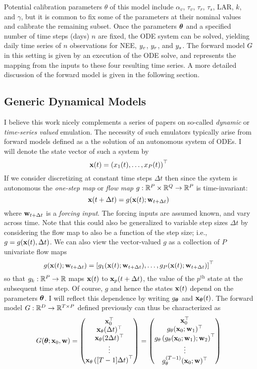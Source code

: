 \documentclass[12pt]{article}
\begin{document}
Potential calibration parameters $\theta$ of this model include $\alpha_v$, $\tau_v$, $\tau_r$, $\tau_s$, $\text{LAR}$, $k$, and $\gamma$, but it is common to fix some of the parameters at their 
nominal values and calibrate the remaining subset. 
Once the parameters $\boldsymbol{\theta}$ and a specified number of time steps (days) $n$ are fixed, the ODE system can be solved, yielding daily time series of $n$
observations for NEE, $y_v$, $y_r$, and $y_s$. The forward model $G$ in this setting is given by an execution of the ODE solve, and represents
the mapping from the inputs to these four resulting time series. A more detailed discussion of the forward model is given in the following section. 

\subsection{Generic Dynamical Models}
I believe this work nicely complements a series of papers on so-called \textit{dynamic} or \textit{time-series valued} emulation. The necessity of such emulators typically arise from forward models 
defined as a the solution of an autonomous system of ODEs. I will denote the state vector of such a system by 
\[\mathbf{x}(t) = \left(x_1(t), \dots, x_P(t) \right)^{\top} \]
If we consider discretizing at constant time steps $\Delta t$ then since the system is autonomous the \textit{one-step map} or \textit{flow map} $g: \mathbb{R}^P \times \mathbb{R}^Q \to \mathbb{R}^P$ is time-invariant: 
 \[\mathbf{x}(t + \Delta t) = g(\mathbf{x}(t); \mathbf{w}_{t + \Delta t})\]
 where $\mathbf{w}_{t + \Delta t}$ is a \textit{forcing input}. The forcing inputs are assumed known, and vary across time. 
 Note that this could also be generalized to variable step sizes $\Delta t$ by considering the flow map to also be a function of the step size; i.e., $g = g(\mathbf{x}(t), \Delta t)$. We can also view the 
 vector-valued $g$ as a collection of $P$ univariate flow maps
 \[g(\mathbf{x}(t); \mathbf{w}_{t + \Delta t}) = \left[g_1(\mathbf{x}(t); \mathbf{w}_{t + \Delta t}), \dots, g_P(\mathbf{x}(t); \mathbf{w}_{t + \Delta t}) \right]^{\top}\]
 so that $g_k: \mathbb{R}^P \to \mathbb{R}$ maps $\mathbf{x}(t)$ to $\mathbf{x}_p(t + \Delta t)$, the value of the $p^{\text{th}}$ state at the subsequent time step. Of course, $g$ and hence the states $\mathbf{x}(t)$ depend on 
 the parameters $\boldsymbol{\theta}$. I will reflect this dependence by writing $g_{\boldsymbol{\theta}}$ and $\mathbf{x}_{\boldsymbol{\theta}}(t)$. The forward model $G: \mathbb{R}^{D} \to \mathbb{R}^{T \times P}$ defined previously can thus be characterized 
 as 
 \[
 G(\boldsymbol{\theta}; \mathbf{x}_0, \mathbf{w}) = \begin{pmatrix} \mathbf{x}_0^{\top} \\ \mathbf{x}_\theta(\Delta t)^{\top} \\  \mathbf{x}_\theta(2\Delta t)^{\top} \\ \vdots \\ \mathbf{x}_\theta\left([T-1]\Delta t\right)^{\top} \end{pmatrix} = 
 \begin{pmatrix} \mathbf{x}_0^{\top} \\ g_\theta(\mathbf{x}_0; \mathbf{w}_1)^{\top} \\  g_\theta\left(g_\theta(\mathbf{x}_0; \mathbf{w}_1); \mathbf{w}_2 \right)^{\top} \\ \vdots \\ g_\theta^{(T-1)}(\mathbf{x}_0; \mathbf{w})^{\top} \end{pmatrix}
 \]
\end{document}
